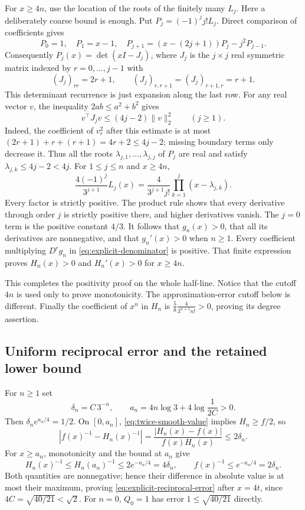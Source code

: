 \documentclass[11pt,a4paper]{article}
\theoremstyle{definition}
\begin{document}
For $x\ge4n$, use the location of the roots of the finitely many $L_j$.
Here a deliberately coarse bound is enough. Put
$P_j=(-1)^j j!L_j$. Direct comparison of coefficients gives
\[
 P_0=1,\quad P_1=x-1,\quad
 P_{j+1}=(x-(2j+1))P_j-j^2P_{j-1}.
\]
Consequently $P_j(x)=\det(xI-J_j)$, where $J_j$ is the $j\times j$
real symmetric matrix indexed by $r=0,\ldots,j-1$ with
\[
 (J_j)_{rr}=2r+1,\qquad
 (J_j)_{r,r+1}=(J_j)_{r+1,r}=r+1.
\]
This determinant recurrence is just expansion along the last row.
For any real vector $v$, the inequality $2ab\le a^2+b^2$ gives
\[
 v^\top J_jv\le(4j-2)\|v\|_2^2\qquad(j\ge1).
\]
Indeed, the coefficient of $v_r^2$ after this estimate is at most
$(2r+1)+r+(r+1)=4r+2\le4j-2$; missing boundary terms only decrease it.
Thus all the roots $\lambda_{j,1},\ldots,\lambda_{j,j}$ of $P_j$ are
real and satisfy $\lambda_{j,k}\le4j-2<4j$. For $1\le j\le n$ and
$x\ge4n$,
\[
 \frac{4(-1)^j}{3^{j+1}}L_j(x)
 =\frac4{3^{j+1}j!}\prod_{k=1}^j(x-\lambda_{j,k}).
\]
Every factor is strictly positive. The product rule shows that every
derivative through order $j$ is strictly positive there, and higher
derivatives vanish. The $j=0$ term is the positive constant $4/3$.
It follows that $g_n(x)>0$, that all its derivatives are nonnegative,
and that $g_n'(x)>0$ when $n\ge1$.
Every coefficient multiplying $D^rg_n$ in
\eqref{eq:explicit-denominator} is positive. That finite expression proves
$H_n(x)>0$ and $H_n'(x)>0$ for $x\ge4n$.

This completes the positivity proof on the whole half-line. Notice that
the cutoff $4n$ is used only to prove monotonicity. The approximation-error
cutoff below is different. Finally the coefficient of $x^n$ in $H_n$ is
$\frac58\frac4{3^{n+1}n!}>0$, proving its degree assertion.

\subsection{Uniform reciprocal error and the retained lower bound}

For $n\ge1$ set
\[
 \delta_n=C\,3^{-n},\qquad
 a_n=4n\log3+4\log\frac1{2C}>0.
\]
Then $\delta_ne^{a_n/4}=1/2$. On $[0,a_n]$,
\eqref{eq:twice-smooth-value} implies $H_n\ge f/2$, so
\[
 \left|f(x)^{-1}-H_n(x)^{-1}\right|
 =\frac{|H_n(x)-f(x)|}{f(x)H_n(x)}
 \le2\delta_n.
\]
For $x\ge a_n$, monotonicity and the bound at $a_n$ give
\[
 H_n(x)^{-1}\le H_n(a_n)^{-1}\le2e^{-a_n/4}
 =4\delta_n,\qquad
 f(x)^{-1}\le e^{-a_n/4}=2\delta_n.
\]
Both quantities are nonnegative; hence their difference in absolute value
is at most their maximum, proving \eqref{eq:explicit-reciprocal-error}
after $x=4t$, since $4C=\sqrt{40/21}<\sqrt2$. For $n=0$, $Q_0=1$
has error $1\le\sqrt{40/21}$ directly.
\end{document}
